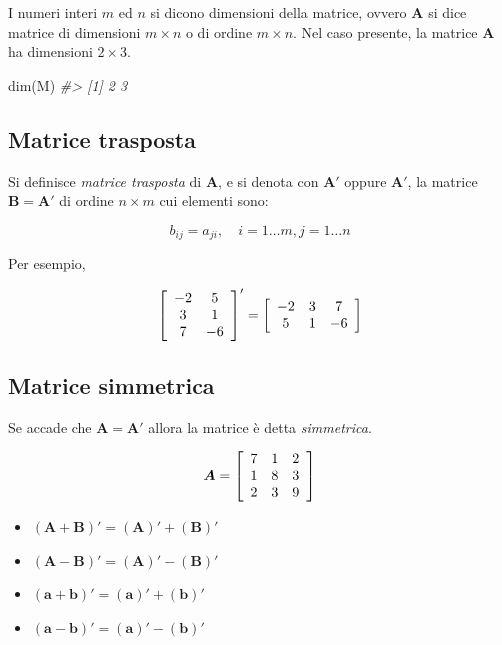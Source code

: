 \documentclass[
  11pt,
]{krantz}
\makeatletter
\newenvironment{Shaded}{\begin{snugshade}}{\end{snugshade}}
\newcommand{\CommentTok}[1]{\textcolor[rgb]{0.37,0.37,0.37}{\textit{#1}}}
\newcommand{\FunctionTok}[1]{\textcolor[rgb]{0,0,0}{#1}}
\newcommand{\NormalTok}[1]{#1}
\newenvironment{kframe}{%
\medskip{}
\setlength{\fboxsep}{.8em}
 \def\at@end@of@kframe{}%
 \ifinner\ifhmode%
  \def\at@end@of@kframe{\end{minipage}}%
  \begin{minipage}{\columnwidth}%
 \fi\fi%
 \def\FrameCommand##1{\hskip\@totalleftmargin \hskip-\fboxsep
 \colorbox{shadecolor}{##1}\hskip-\fboxsep
     \hskip-\linewidth \hskip-\@totalleftmargin \hskip\columnwidth}%
 \MakeFramed {\advance\hsize-\width
   \@totalleftmargin\z@ \linewidth\hsize
   \@setminipage}}%
 {\par\unskip\endMakeFramed%
 \at@end@of@kframe}
\renewenvironment{Shaded}{\begin{kframe}}{\end{kframe}}
\theoremstyle{definition}
\theoremstyle{definition}
\theoremstyle{definition}
\theoremstyle{definition}
\theoremstyle{remark}
\makeatother
\begin{document}
I numeri interi \(m\) ed \(n\) si dicono dimensioni della matrice, ovvero \(\boldsymbol{A}\) si dice matrice di dimensioni \(m \times n\) o di ordine \(m \times n\). Nel caso presente, la matrice \(\boldsymbol{A}\) ha dimensioni \(2 \times 3\).

\begin{Shaded}
\begin{Highlighting}[]
\FunctionTok{dim}\NormalTok{(M)}
\CommentTok{\#\textgreater{} [1] 2 3}
\end{Highlighting}
\end{Shaded}

\hypertarget{matrice-trasposta}{%
\subsection{Matrice trasposta}\label{matrice-trasposta}}

Si definisce \emph{matrice trasposta} di \(\boldsymbol{A}\), e si denota con \(\boldsymbol{A}'\) oppure \(\boldsymbol{A}'\), la matrice \(\boldsymbol{B} = \boldsymbol{A}'\) di ordine \(n \times m\) cui elementi sono:

\[
b_{ij} = a_{ji},  \quad        i = 1 \dots m, j = 1 \dots n
\]

Per esempio,

\[
\left[ \begin{array}{c c}
-2 & 5\\
3 & 1\\
7 & -6
\end{array}
 \right]'=
\left[ \begin{array}{c c c}
-2 & 3 & 7\\
5 & 1 & -6
\end{array}
 \right]
 \]

\hypertarget{matrice-simmetrica}{%
\subsection{Matrice simmetrica}\label{matrice-simmetrica}}

Se accade che \(\boldsymbol{A} = \boldsymbol{A}'\) allora la matrice è detta \emph{simmetrica}.

\[
\boldsymbol{A} =  \left[ \begin{array}{c c c}
7 & 1 & 2\\
1 & 8 & 3\\
2 & 3 & 9 \end{array} \right]
\]

\begin{itemize}
\item
  \((\boldsymbol{A} + \boldsymbol{B})' = (\boldsymbol{A})' + (\boldsymbol{B})'\)
\item
  \((\boldsymbol{A} - \boldsymbol{B})' = (\boldsymbol{A})' - (\boldsymbol{B})'\)
\item
  \((\boldsymbol{a} + \boldsymbol{b})' = (\boldsymbol{a})' + (\boldsymbol{b})'\)
\item
  \((\boldsymbol{a} - \boldsymbol{b})' = (\boldsymbol{a})' - (\boldsymbol{b})'\)
\end{itemize}
\end{document}
